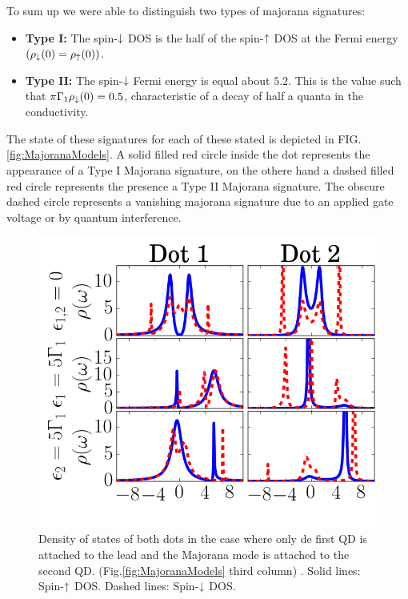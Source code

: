 \documentclass[showpacs,aps,prb,reprint,superscriptaddress]{revtex4-1}
\begin{document}
    To sum up we were able to distinguish two types of majorana signatures:
     \begin{itemize}
         \item \textbf{Type I: }  The spin-$\downarrow$ DOS is the half of the spin-$\uparrow$ DOS  at the Fermi energy $(\rho_\downarrow(0)=\rho_\uparrow(0))$. 
         \item \textbf{Type II: } The spin-$\downarrow$ Fermi energy is equal about $5.2$. This is the value such that  $\pi  \Gamma_1 \rho_\downarrow(0) = 0.5$, characteristic of a decay of half a quanta in the conductivity. 
     \end{itemize}
     The state of these signatures for each of these stated is depicted in FIG.\ref{fig:MajoranaModels}. A solid filled red circle inside the dot represents the appearance of a Type I Majorana signature, on the othere hand a dashed filled red circle represents the presence a  Type II Majorana signature. The obscure dashed circle represents a vanishing majorana signature due to an applied gate voltage or by quantum interference.
    
\begin{figure}[bt]
\begin{center}
\includegraphics[scale=0.48]{Graficos/t1=0.png}
\caption{  \label{fig:IndirectMajorana} Density of states of both dots in the case where only de first QD is attached to the lead and the Majorana mode is attached to the second QD.  (Fig.\ref{fig:MajoranaModels} third column) . Solid lines: Spin-$\uparrow$ DOS. Dashed lines: Spin-$\downarrow$ DOS. 
}
%
\label{fig:GenModel}
\end{center}
\end{figure}
 
\end{document}
